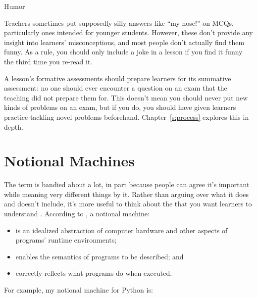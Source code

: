 \begin{aside}{Humor}

  Teachers sometimes put supposedly-silly answers like ``my nose!'' on MCQs,
  particularly ones intended for younger students.
  However,
  these don't provide any insight into learners' misconceptions,
  and most people don't actually find them funny.
  As a rule,
  you should only include a joke in a lesson if you find it funny
  the third time you re-read it.

\end{aside}

A lesson's formative assessments should prepare learners for its summative assessment:
no one should ever encounter a question on an exam that the teaching did not prepare them for.
This doesn't mean you should never put new kinds of problems on an exam,
but if you do,
you should have given learners practice tackling novel problems beforehand.
Chapter~\ref{s:process} explores this in depth.

\section{Notional Machines}\label{s:models-notional}

The term  is bandied about a lot,
in part because people can agree it's important while meaning very different things by it.
Rather than arguing over what it does and doesn't include,
it's more useful to think about the 
that you want learners to understand \cite{DuBo1986}.
According to \cite{Sorv2013},
a notional machine:

\begin{itemize}

\item
  is an idealized abstraction of computer hardware
  and other aspects of programs' runtime environments;

\item
  enables the semantics of programs to be described;
  and

\item
  correctly reflects what programs do when executed.

\end{itemize}

\noindent
For example, my notional machine for Python is:

